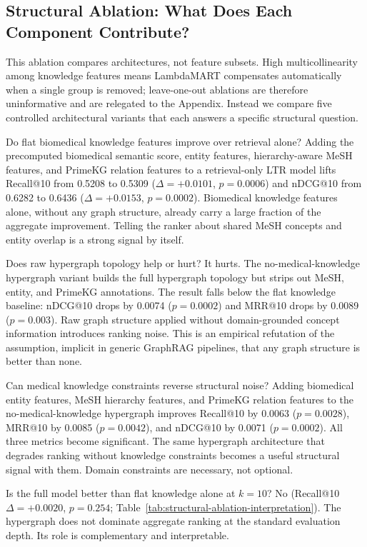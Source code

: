 \subsection{Structural Ablation: What Does Each Component Contribute?}
\label{sec:ablation}

This ablation compares architectures, not feature subsets. High multicollinearity among knowledge features means LambdaMART compensates automatically when a single group is removed; leave-one-out ablations are therefore uninformative and are relegated to the Appendix. Instead we compare five controlled architectural variants that each answers a specific structural question.



Do flat biomedical knowledge features improve over retrieval alone? Adding the precomputed biomedical semantic score, entity features, hierarchy-aware MeSH features, and PrimeKG relation features to a retrieval-only LTR model lifts Recall@10 from 0.5208 to 0.5309 ($\Delta{=}+0.0101$, $p{=}0.0006$) and nDCG@10 from 0.6282 to 0.6436 ($\Delta{=}+0.0153$, $p{=}0.0002$). Biomedical knowledge features alone, without any graph structure, already carry a large fraction of the aggregate improvement. Telling the ranker about shared MeSH concepts and entity overlap is a strong signal by itself.

Does raw hypergraph topology help or hurt? It hurts. The no-medical-knowledge hypergraph variant builds the full hypergraph topology but strips out MeSH, entity, and PrimeKG annotations. The result falls below the flat knowledge baseline: nDCG@10 drops by 0.0074 ($p{=}0.0002$) and MRR@10 drops by 0.0089 ($p{=}0.003$). Raw graph structure applied without domain-grounded concept information introduces ranking noise. This is an empirical refutation of the assumption, implicit in generic GraphRAG pipelines, that any graph structure is better than none.

Can medical knowledge constraints reverse structural noise? Adding biomedical entity features, MeSH hierarchy features, and PrimeKG relation features to the no-medical-knowledge hypergraph improves Recall@10 by 0.0063 ($p{=}0.0028$), MRR@10 by 0.0085 ($p{=}0.0042$), and nDCG@10 by 0.0071 ($p{=}0.0002$). All three metrics become significant. The same hypergraph architecture that degrades ranking without knowledge constraints becomes a useful structural signal with them. Domain constraints are necessary, not optional.

Is the full model better than flat knowledge alone at $k{=}10$? No (Recall@10 $\Delta{=}+0.0020$, $p{=}0.254$; Table~\ref{tab:structural-ablation-interpretation}). The hypergraph does not dominate aggregate ranking at the standard evaluation depth. Its role is complementary and interpretable.

